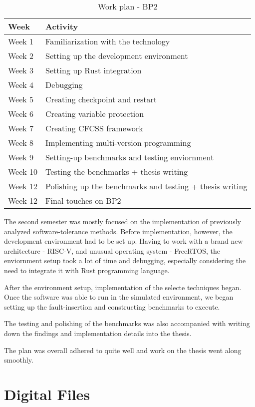 \documentclass[12pt, letterpaper, slovak]{article}
\begin{document}
\begin{appendices}
\newpage

\begin{table}[!h]
\centering
\begin{tabular}{|l|l|}
\hline
\textbf{Week} & \textbf{Activity} \\
\hline
Week 1 & Familiarization with the technology \\
Week 2 & Setting up the development environment \\
Week 3 & Setting up Rust integration \\
Week 4 & Debugging \\
Week 5 & Creating checkpoint and restart  \\
Week 6 & Creating variable protection  \\
Week 7 & Creating CFCSS framework \\
Week 8 & Implementing multi-version programming \\
Week 9 & Setting-up benchmarks and testing enviornment \\
Week 10 & Testing the benchmarks + thesis writing \\
Week 12 & Polishing up the benchmarks and testing + thesis writing \\
Week 12 & Final touches on BP2 \\
\hline
\end{tabular}
\caption{Work plan - BP2}
\label{tab:work_plan_bp2}
\end{table}

The second semester was mostly focused on the implementation of previously analyzed software-tolerance methods. Before implementation, however, the development environment had to be set up. Having to work with a brand new architecture - RISC-V, and unusual operating system - FreeRTOS, the enviornment setup took a lot of time and debugging, especially considering the need to integrate it with Rust programming language.

After the environment setup, implementation of the selecte techniques began. Once the software was able to run in the simulated environment, we began setting up the fault-insertion and constructing benchmarks to execute.

The testing and polishing of the benchmarks was also accompanied with writing down the findings and implementation details into the thesis.

The plan was overall adhered to quite well and work on the thesis went along smoothly.

\clearpage
\section{Digital Files}


\end{appendices}
\end{document}
